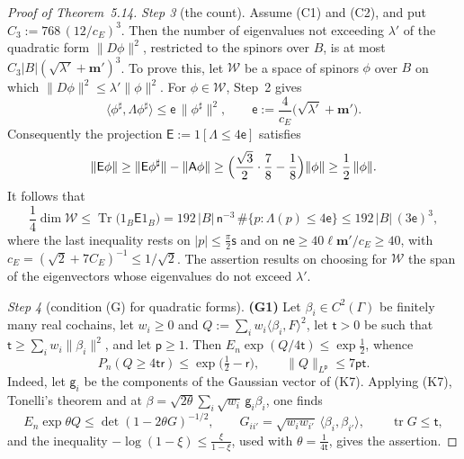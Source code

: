 \documentclass[11pt,letterpaper,reqno]{amsart}
\theoremstyle{definition}
\begin{document}
\begin{proof}[Proof of Theorem~5.14]
\emph{Step 3} (the count).
Assume (C1) and (C2), and put $C_3:=768\,(12/c_E)^3$.
Then the number of eigenvalues not exceeding $\lambda'$ of the quadratic form $\|D\phi\|^2$, restricted to the spinors over $B$, is at most $C_3|B|(\sqrt{\lambda'}+\mathbf m')^3$.
To prove this, let $\mathcal W$ be a space of spinors $\phi$ over $B$ on which $\|D\phi\|^2\le\lambda'\|\phi\|^2$.
For $\phi\in\mathcal W$, Step~2 gives
\begin{equation*}
\langle\phi^\sharp,\Lambda\phi^\sharp\rangle\le\mathsf e\,\|\phi^\sharp\|^2,\qquad\mathsf e:=\frac{4}{c_E}\bigl(\sqrt{\lambda'}+\mathbf m'\bigr).
\end{equation*}
Consequently the projection $\mathsf E:=1[\Lambda\le4\mathsf e]$ satisfies
\begin{equation*}
\|\mathsf E\phi\|\ge\|\mathsf E\phi^\sharp\|-\|\mathsf A\phi\|\ge\Bigl(\frac{\sqrt3}{2}\cdot\frac78-\frac18\Bigr)\|\phi\|\ge\frac12\,\|\phi\|.
\end{equation*}
It follows that
\begin{equation*}
\frac14\dim\mathcal W\le\operatorname{Tr}\bigl(1_B\mathsf E1_B\bigr)=192\,|B|\,\mathsf n^{-3}\,\#\{p:\Lambda(p)\le4\mathsf e\}\le192\,|B|\,(3\mathsf e)^3,
\end{equation*}
where the last inequality rests on $|p|\le\frac\pi2\mathsf s$ and on $\mathsf n\mathsf e\ge40\ell\mathbf m'/c_E\ge40$, with $c_E=(\sqrt2+7C_E)^{-1}\le1/\sqrt2$.
The assertion results on choosing for $\mathcal W$ the span of the eigenvectors whose eigenvalues do not exceed $\lambda'$.

\emph{Step 4} (condition (G) for quadratic forms).
\textbf{(G1)} Let $\beta_i\in C^2(\Gamma)$ be finitely many real cochains, let $w_i\ge0$ and $Q:=\sum_iw_i\langle\beta_i,F\rangle^2$, let $\mathsf t>0$ be such that $\mathsf t\ge\sum_iw_i\|\beta_i\|^2$, and let $\mathsf p\ge1$.
Then $E_n\exp(Q/4\mathsf t)\le\exp\frac12$, whence
\begin{equation*}
P_n(Q\ge4\mathsf t\mathsf r)\le\exp\bigl(\tfrac12-\mathsf r\bigr),\qquad\|Q\|_{L^{\mathsf p}}\le7\mathsf p\mathsf t.
\end{equation*}
Indeed, let $\mathsf g_i$ be the components of the Gaussian vector of (K7).
Applying (K7), Tonelli's theorem and \cite[Theorem~6.27\,(a)]{QEDII} at $\beta=\sqrt{2\theta}\sum_i\sqrt{w_i}\,\mathsf g_i\beta_i$, one finds
\begin{equation*}
E_n\exp\theta Q\le\det(1-2\theta G)^{-1/2},\qquad G_{ii'}=\sqrt{w_iw_{i'}}\,\langle\beta_i,\beta_{i'}\rangle,\qquad\operatorname{tr}G\le\mathsf t,
\end{equation*}
and the inequality $-\log(1-\xi)\le\frac{\xi}{1-\xi}$, used with $\theta=\frac1{4\mathsf t}$, gives the assertion.


\end{proof}
\end{document}
